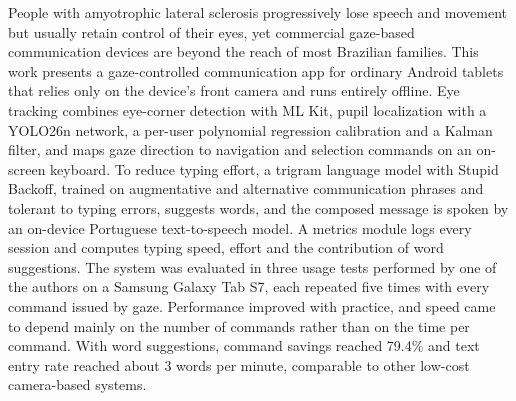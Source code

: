 People with amyotrophic lateral sclerosis progressively lose speech and movement but usually retain control of their eyes, yet commercial gaze-based communication devices are beyond the reach of most Brazilian families. This work presents a gaze-controlled communication app for ordinary Android tablets that relies only on the device's front camera and runs entirely offline. Eye tracking combines eye-corner detection with ML Kit, pupil localization with a YOLO26n network, a per-user polynomial regression calibration and a Kalman filter, and maps gaze direction to navigation and selection commands on an on-screen keyboard. To reduce typing effort, a trigram language model with Stupid Backoff, trained on augmentative and alternative communication phrases and tolerant to typing errors, suggests words, and the composed message is spoken by an on-device Portuguese text-to-speech model. A metrics module logs every session and computes typing speed, effort and the contribution of word suggestions. The system was evaluated in three usage tests performed by one of the authors on a Samsung Galaxy Tab S7, each repeated five times with every command issued by gaze. Performance improved with practice, and speed came to depend mainly on the number of commands rather than on the time per command. With word suggestions, command savings reached 79.4\% and text entry rate reached about 3 words per minute, comparable to other low-cost camera-based systems.
